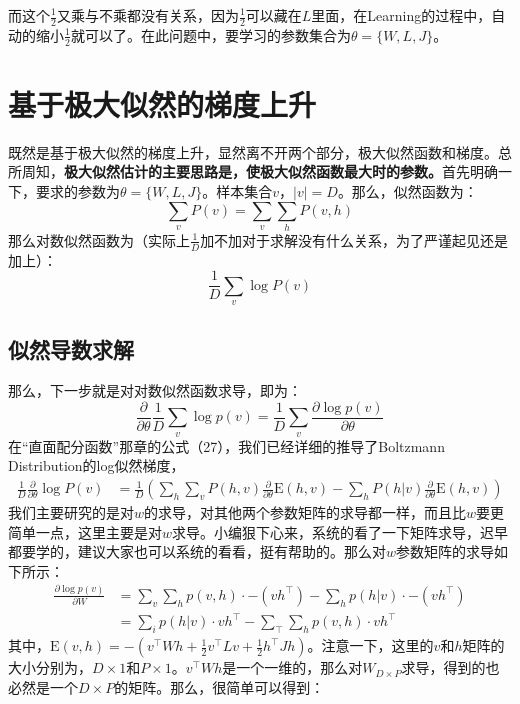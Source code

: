 \documentclass[a4paper]{article}
\begin{document}
而这个$\frac{1}{2}$又乘与不乘都没有关系，因为$\frac{1}{2}$可以藏在$L$里面，在Learning的过程中，自动的缩小$\frac{1}{2}$就可以了。在此问题中，要学习的参数集合为$\theta = \{ W,L,J \}$。

\section{基于极大似然的梯度上升}
既然是基于极大似然的梯度上升，显然离不开两个部分，极大似然函数和梯度。总所周知，\textbf{极大似然估计的主要思路是，使极大似然函数最大时的参数。}首先明确一下，要求的参数为$\theta = \{ W,L,J \}$。样本集合$v$，$|v|=D$。那么，似然函数为：
$$\sum_v P(v) = \sum_v \sum_{h}P(v,h)$$
那么对数似然函数为（实际上$\frac{1}{D}$加不加对于求解没有什么关系，为了严谨起见还是加上）：
$$\frac{1}{D}\sum_v \log P(v)$$
\subsection{似然导数求解}
那么，下一步就是对对数似然函数求导，即为：
\begin{equation}
\frac{\partial}{\partial \theta} \frac{1}{D} \sum_{v} \log p(v)=\frac{1}{D} \sum_{v} \frac{\partial \log p(v)}{\partial \theta}
\end{equation}
在“直面配分函数”那章的公式（27），我们已经详细的推导了Boltzmann Distribution的log似然梯度，
\begin{equation}\begin{aligned}
\frac{1}{D} \frac{\partial}{\partial \theta} \log P(v) 
&=\frac{1}{D}\left(\sum_{h} \sum_{v} P(h, v) \frac{\partial}{\partial \theta} \mathrm{E}(h, v)-\sum_{h} P(h | v) \frac{\partial}{\partial \theta} \mathrm{E}(h, v)\right)
\end{aligned}\end{equation}
我们主要研究的是对$w$的求导，对其他两个参数矩阵的求导都一样，而且比$w$要更简单一点，这里主要是对$w$求导。小编狠下心来，系统的看了一下矩阵求导，迟早都要学的，建议大家也可以系统的看看，挺有帮助的。那么对$w$参数矩阵的求导如下所示：
\begin{equation}\begin{aligned}
\frac{\partial \log p(v)}{\partial W} &=\sum_{v} \sum_{h} p(v, h) \cdot-\left(v h^{\top}\right) - \sum_{h} p(h | v) \cdot - \left(v h^{\top}\right) \\
&=\sum_{i} p(h | v) \cdot v h^{\top}-\sum_{\top} \sum_{h} p(v, h) \cdot v h^{\top}
\end{aligned}\end{equation}
其中，$\text{E}(v, h)=-\left(v^{\top}Wh+\frac{1}{2} v^{\top} L v+\frac{1}{2} h^{\top} J h\right)$。注意一下，这里的$v$和$h$矩阵的大小分别为，$D\times  1$和$P\times 1$。$v^{\top}Wh$是一个一维的，那么对$W_{D\times  P}$求导，得到的也必然是一个$D\times  P$的矩阵。那么，很简单可以得到：
\end{document}
